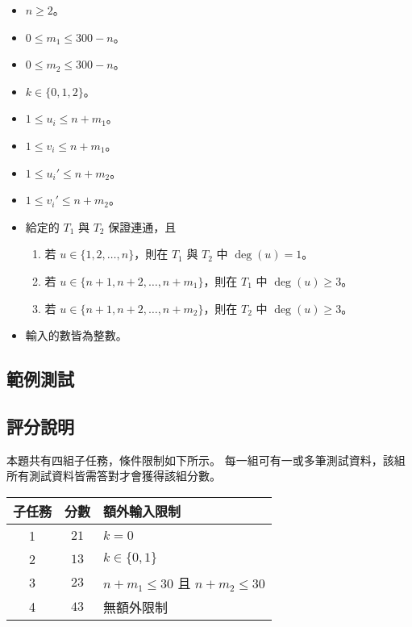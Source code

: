 \begin{itemize}
\tightlist
\item
  \(n \ge 2\)。
\item
  \(0 \le m_1 \le 300-n\)。
\item
  \(0 \le m_2 \le 300-n\)。
\item
  \(k \in \{0, 1, 2\}\)。
\item
  \(1 \le u_i \le n+m_1\)。
\item
  \(1 \le v_i \le n+m_1\)。
\item
  \(1 \le u_i' \le n+m_2\)。
\item
  \(1 \le v_i' \le n+m_2\)。
\item
  給定的 \(T_1\) 與 \(T_2\) 保證連通，且

  \begin{enumerate}
  \def\labelenumi{\arabic{enumi}.}
  \tightlist
  \item
    若 \(u \in \{1, 2, \ldots, n\}\)，則在 \(T_1\) 與 \(T_2\) 中
    \(\deg(u) = 1\)。
  \item
    若 \(u \in \{n+1, n+2, \ldots, n+m_1\}\)，則在 \(T_1\) 中
    \(\deg(u) \ge 3\)。
  \item
    若 \(u \in \{n+1, n+2, \ldots, n+m_2\}\)，則在 \(T_2\) 中
    \(\deg(u) \ge 3\)。
  \end{enumerate}
\item
  輸入的數皆為整數。
\end{itemize}

\subsection{範例測試}

\begin{example}
%
%
%
%
\end{example}

\subsection{評分說明}

本題共有四組子任務，條件限制如下所示。
每一組可有一或多筆測試資料，該組所有測試資料皆需答對才會獲得該組分數。

\begin{longtable}[]{@{}ccl@{}}
\toprule
子任務 & 分數 & 額外輸入限制 \\
\midrule
\endhead
1 & \(21\) & \(k = 0\) \\
2 & \(13\) & \(k \in \{0, 1\}\) \\
3 & \(23\) & \(n+m_1 \le 30\) 且 \(n+m_2 \le 30\) \\
4 & \(43\) & 無額外限制 \\
\bottomrule
\end{longtable}

